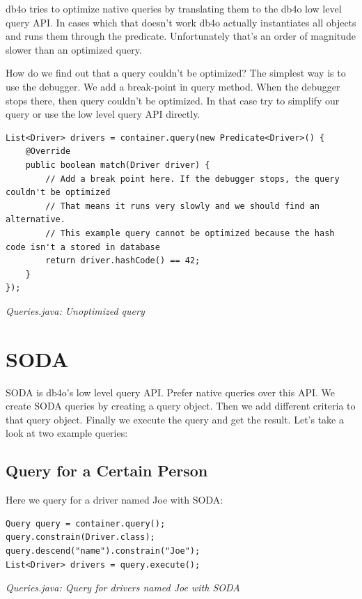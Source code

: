db4o tries to optimize native queries by translating them to the db4o low level query API. In cases which that doesn't work db4o actually instantiates all objects and runs them through the predicate. Unfortunately that's an order of magnitude slower than an optimized query.

How do we find out that a query couldn't be optimized? The simplest way is to use the debugger. We add a break-point in query method. When the debugger stops there, then query couldn't be optimized. In that case try to simplify our query or use the low level query API directly.

\begin{lstlisting}
List<Driver> drivers = container.query(new Predicate<Driver>() {
    @Override
    public boolean match(Driver driver) {
        // Add a break point here. If the debugger stops, the query couldn't be optimized
        // That means it runs very slowly and we should find an alternative.
        // This example query cannot be optimized because the hash code isn't a stored in database
        return driver.hashCode() == 42;
    }
});
\end{lstlisting}

{\small\itshape Queries.java: Unoptimized query\par}
\medskip

\section{SODA}
\label{tut:queries:soda}

SODA is db4o's low level query API. Prefer native queries over this API. We create SODA queries by creating a query object. Then we add different criteria to that query object. Finally we execute the query and get the result. Let's take a look at two example queries:

\subsection*{Query for a Certain Person}

Here we query for a driver named Joe with SODA:

\begin{lstlisting}
Query query = container.query();
query.constrain(Driver.class);
query.descend("name").constrain("Joe");
List<Driver> drivers = query.execute();
\end{lstlisting}

{\small\itshape Queries.java: Query for drivers named Joe with SODA\par}
\medskip


